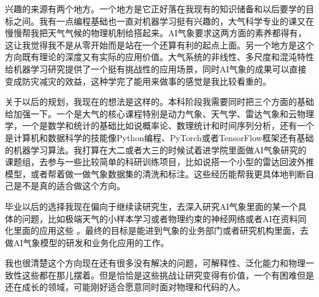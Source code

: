 \documentclass{article}
\begin{document}
兴趣的来源有两个地方。一个地方是它正好落在我现有的知识储备和以后要学的目标之间。我有一点编程基础也一直对机器学习挺有兴趣的，大气科学专业的课又在慢慢帮我把天气气候的物理机制给搭起来。AI气象要求这两方面的素养都得有，这让我觉得我不是从零开始而是站在一个还算有利的起点上面。另一个地方是这个方向既有理论的深度又有实际的应用价值。大气系统的非线性、多尺度和混沌特性给机器学习研究提供了一个挺有挑战性的应用场景，同时AI气象的成果可以直接变成防灾减灾的效益，这种学完了能用来做事的感觉是我比较看重的。

关于以后的规划，我现在的想法是这样的。本科阶段我需要同时把三个方面的基础给加强一下。一个是大气的核心课程特别是动力气象、天气学、雷达气象和云物理学，一个是数学和统计的基础比如说概率论、数理统计和时间序列分析，还有一个是计算机和数据科学的技能像Python编程、PyTorch或者TensorFlow框架还有基础的机器学习算法。我打算在大二或者大三的时候试着进学院里面做AI气象研究的课题组，去参与一些比较简单的科研训练项目，比如说搭一个小型的雷达回波外推模型，或者帮着做一做气象数据集的清洗和标注。这些经历能帮我更具体地判断自己是不是真的适合做这个方向。

毕业以后的选择我现在偏向于继续读研究生，去深入研究AI气象里面的某一个具体的问题，比如极端天气的小样本学习或者物理约束的神经网络或者AI在资料同化里面的应用这些 \cite{Geer2020Machine}。最终的目标是能进到气象的业务部门或者研究机构里面，去做AI气象模型的研发和业务化应用的工作。

我也很清楚这个方向现在还有很多没有解决的问题，可解释性、泛化能力和物理一致性这些都在那儿摆着。但是恰恰是这些挑战让研究变得有价值，一个有困难但是还在成长的领域，可能刚好适合愿意同时面对物理和代码的人。
\end{document}
